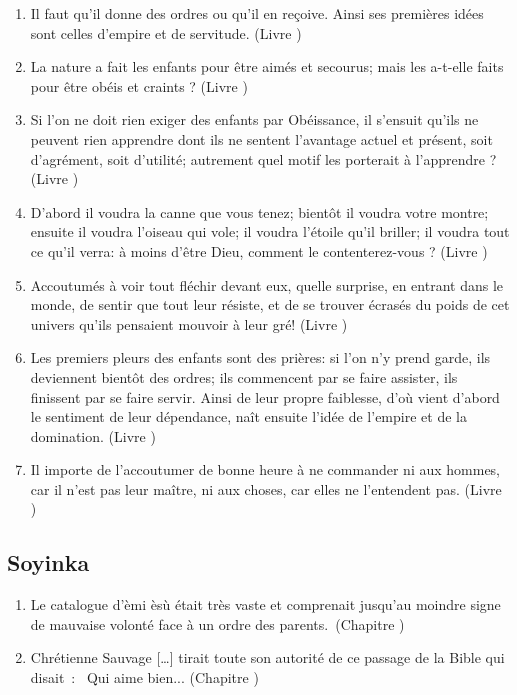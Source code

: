 \documentclass[a4paper, 11pt, hidelinks]{article}
\newcommand{\rb}[1]{\Romanbar{#1}}
\begin{document}
\begin{enumerate}
    \item Il faut qu'il donne des ordres ou qu'il en reçoive. Ainsi ses premières idées sont celles d'empire et de servitude. (Livre \rb{1})
    \item La nature a fait les enfants pour être aimés et secourus; mais les a-t-elle faits pour être obéis et craints ? (Livre \rb{2})
    \item Si l'on ne doit rien exiger des enfants par Obéissance, il s'ensuit qu'ils ne peuvent rien apprendre dont ils ne sentent l'avantage actuel et présent, soit d'agrément, soit d'utilité; autrement quel motif les porterait à l'apprendre ? (Livre \rb{2})
    \item D'abord il voudra la canne que vous tenez; bientôt il voudra votre montre; ensuite il voudra l'oiseau qui vole; il voudra l'étoile qu'il briller; il voudra tout ce qu'il verra: à moins d'être Dieu, comment le contenterez-vous ? (Livre \rb{2})
    \item Accoutumés à voir tout fléchir devant eux, quelle surprise, en entrant dans le monde, de sentir que tout leur résiste, et de se trouver écrasés du poids de cet univers qu'ils pensaient mouvoir à leur gré! (Livre \rb{2})
    \item Les premiers pleurs des enfants sont des prières: si l'on n'y prend garde, ils deviennent bientôt des ordres; ils commencent par se faire assister, ils finissent par se faire servir. Ainsi de leur propre faiblesse, d'où vient d'abord le sentiment de leur dépendance, naît ensuite l'idée de l'empire et de la domination. (Livre \rb{1})
    \item Il importe de l'accoutumer de bonne heure à ne commander ni aux hommes, car il n'est pas leur maître, ni aux choses, car elles ne l'entendent pas. (Livre \rb{1})
\end{enumerate}



\subsection{Soyinka}


\begin{enumerate}
    \item Le catalogue d'èmi èsù était très vaste et comprenait jusqu'au moindre signe de mauvaise volonté face à un ordre des parents. (Chapitre \rb{6})
    \item Chrétienne Sauvage […] tirait toute son autorité de ce passage de la Bible qui disait : \og Qui aime bien... \fg (Chapitre \rb{12})
\end{enumerate}
\end{document}
